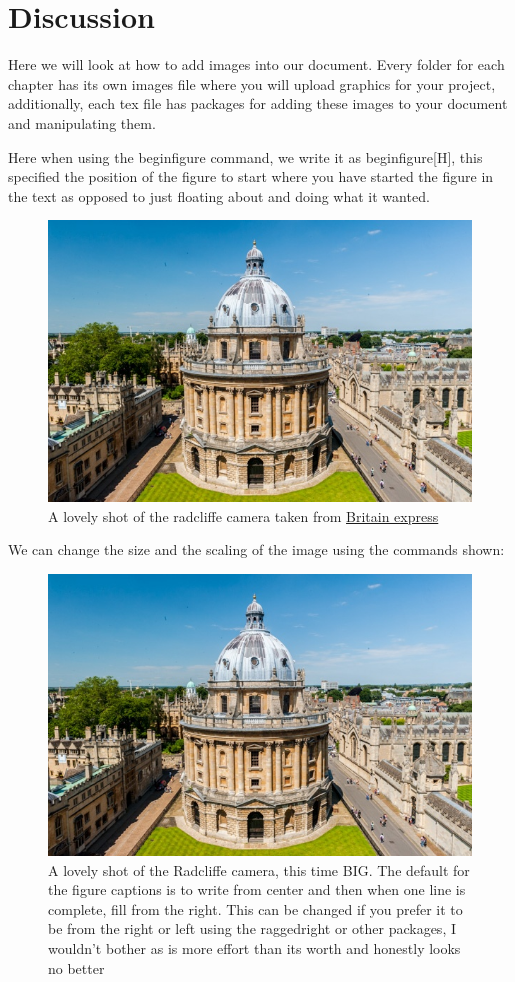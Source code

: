 \documentclass[../main.tex]{subfiles}
\begin{document}
\chapter{Discussion}
\minitoc \mtcskip 

Here we will look at how to add images into our document. Every folder for each chapter has its own images file where you will upload graphics for your project, additionally, each tex file has packages for adding these images to your document and manipulating them. 

Here when using the begin{figure} command, we write it as begin{figure}[H], this specified the position of the figure to start where you have started the figure in the text as opposed to just floating about and doing what it wanted.

\begin{figure}[H]
    \centering
    \includegraphics[width=0.5\linewidth]{Chapter5/images/Radcliffe-Camera-8163.jpg}
    \caption{A lovely shot of the radcliffe camera taken from 
    \href{https://www.britainexpress.com/cities/oxford/radcliffe.htm}{Britain express}}
    \label{fig:enter-label}
\end{figure}

We can change the size and the scaling of the image using the commands shown:

\begin{figure}[H]
    \centering
    \includegraphics[width=0.9\linewidth]{Chapter5/images/Radcliffe-Camera-8163.jpg}
    \caption{A lovely shot of the Radcliffe camera, this time BIG. The default for the figure captions is to write from center and then when one line is complete, fill from the right. This can be changed if you prefer it to be from the right or left using the raggedright or other packages, I wouldn't bother as is more effort than its worth and honestly looks no better}
    \label{fig:enter-label}
\end{figure}
\end{document}
